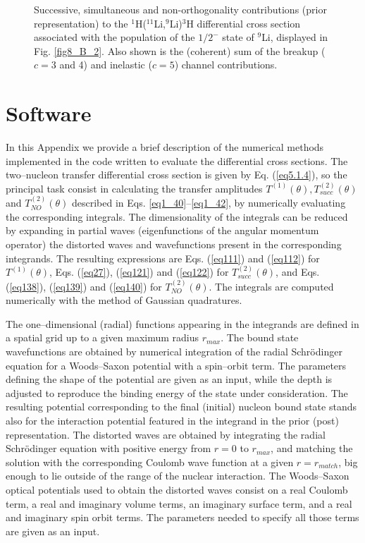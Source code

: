 \begin{subappendices}
\begin{figure}
        	\caption{Successive, simultaneous and non-orthogonality contributions (prior representation)
        	to the  $^1$H($^{11}$Li,$^9$Li)$^3$H differential cross section
        	associated with the population of the $1/2^-$ state
        	of $^9$Li, displayed in Fig. \ref{fig8_B_2}. Also shown is the (coherent) sum of the breakup ($c=3$ and 4) and inelastic ($c=5$) channel contributions.}\label{fig8_B_3}
        \end{figure}

\section{Software}\label{C8AppD}
In this Appendix we provide a brief description of the numerical methods implemented in the code written to evaluate the differential cross sections. The two--nucleon transfer differential cross section is given by Eq. (\ref{eq5.1.4}),  so the principal task consist in calculating the transfer amplitudes $T^{(1)}(\theta),T^{(2)}_{succ}(\theta)$ and $T^{(2)}_{NO}(\theta)$ described in Eqs. \ref{eq1_40}--\ref{eq1_42}, by numerically evaluating the corresponding integrals.  The dimensionality of the integrals  can be reduced by expanding in partial waves (eigenfunctions of the angular momentum operator) the distorted waves and wavefunctions present in the corresponding integrands. The resulting expressions are Eqs. (\ref{eq111}) and (\ref{eq112}) for $T^{(1)}(\theta)$, Eqs. (\ref{eq27}), (\ref{eq121}) and (\ref{eq122}) for $T^{(2)}_{succ}(\theta)$, and Eqs. (\ref{eq138}), (\ref{eq139}) and (\ref{eq140}) for $T^{(2)}_{NO}(\theta)$. The integrals are computed numerically with the method of Gaussian quadratures. 


The one--dimensional (radial) functions appearing in the integrands are defined in a spatial grid up to a given maximum radius $r_{max}$. The bound state  wavefunctions are obtained by numerical integration of the radial Schr\"odinger equation for a Woods--Saxon potential with a spin--orbit term. The parameters defining the shape of the potential are given as an input, while the depth is adjusted to reproduce the binding energy of the state under consideration. The resulting potential corresponding to the final (initial) nucleon bound state stands also for the interaction potential featured in the integrand in the prior (post) representation. The distorted waves are obtained by integrating the radial Schr\"odinger equation with positive energy from $r=0$ to $r_{max}$, and matching the solution with the corresponding Coulomb wave function at a given $r=r_{match}$, big enough to lie outside of the range of the nuclear interaction. The  Woods--Saxon optical potentials  used to obtain the distorted waves consist on a real Coulomb term, a real and imaginary volume terms, an imaginary surface term, and a real and imaginary spin orbit terms. The parameters needed to specify all those terms are given as an input.  





\end{subappendices}
